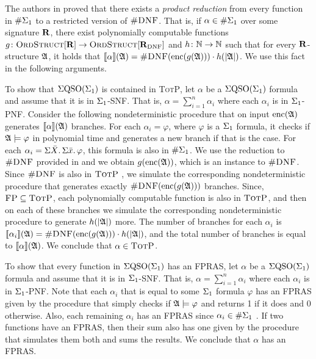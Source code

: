 
The authors in \cite{SalujaST95} proved that there exists a {\em product reduction} from every function in $\#\Sigma_{1}$ to a restricted version of $\textsc{\#DNF}$. 
That is, if $\alpha\in\#\Sigma_{1}$ over some signature $\mathbf{R}$, there exist polynomially computable functions $g\colon\text{\sc OrdStruct}[\mathbf{R}]\to\text{\sc OrdStruct}[\mathbf{R}_{\text{DNF}}]$ and $h\colon\mathbb{N}\to\mathbb{N}$ such that for every $\mathbf{R}$-structure $\mathfrak{A}$, it holds that ${\llbracket{}{\alpha}\rrbracket}(\mathfrak{A}) = \textsc{\#DNF}({\rm enc}(g(\mathfrak{A})))\cdot h(\vert \mathfrak{A} \vert)$. We use this fact in the following arguments. 

To show that $\Sigma{\rm QSO}(\Sigma_{1})$ is contained  in \textsc{TotP}, let $\alpha$ be a $\Sigma{\rm QSO}(\Sigma_{1})$ formula and assume that it is in $\Sigma_{1}$-SNF. 
That is, $\alpha = \sum_{i = 1}^n\alpha_i$ where each $\alpha_i$ is in $\Sigma_{1}$-PNF. 
Consider the following nondeterministic procedure that on input ${\rm enc}(\mathfrak{A})$ generates ${\llbracket{}{\alpha}\rrbracket}(\mathfrak{A})$ branches. 
For each $\alpha_i = \varphi$, where $\varphi$ is a $\Sigma_{1}$ formula, it checks if $\mathfrak{A}\models\varphi$ in polynomial time and generates a new branch if that is the case. 
For each $\alpha_i = \Sigma{\bar{X}}.\,\Sigma{\bar{x}}.\,\varphi$, this formula is also in $\#\Sigma_{1}$. 
We use the reduction to $\textsc{\#DNF}$ provided in \cite{SalujaST95} and we obtain $g({\rm enc}(\mathfrak{A}))$, which is an instance to $\textsc{\#DNF}$. 
Since $\textsc{\#DNF}$ is also in $\text{\sc TotP}$ \cite{PagourtzisZ06}, we simulate the corresponding nondeterministic procedure that generates exactly $\textsc{\#DNF}({\rm enc}(g(\mathfrak{A})))$ branches. 
Since, $\text{\sc FP}\subseteq\text{\sc TotP}$\cite{PagourtzisZ06}, each polynomially computable function is also in $\text{\sc TotP}$, and then on each of these branches we simulate the corresponding nondeterministic procedure to generate $h(\vert \mathfrak{A} \vert)$ more. 
The number of branches for each $\alpha_i$ is ${\llbracket{}{\alpha_i}\rrbracket}(\mathfrak{A}) = \textsc{\#DNF}({\rm enc}(g(\mathfrak{A})))\cdot h(\vert \mathfrak{A} \vert)$, and the total number of branches is equal to ${\llbracket{}{\alpha}\rrbracket}(\mathfrak{A})$. 
We conclude that $\alpha\in\text{\sc TotP}$.

To show that every function in $\Sigma{\rm QSO}(\Sigma_{1})$ has an FPRAS,  let $\alpha$ be a $\Sigma{\rm QSO}(\Sigma_{1})$ formula and assume that it is in $\Sigma_{1}$-SNF. 
That is, $\alpha = \sum_{i = 1}^n\alpha_i$ where each $\alpha_i$ is in $\Sigma_{1}$-PNF. 
Note that each $\alpha_i$ that is equal to some $\Sigma_{1}$ formula $\varphi$ has an FPRAS given by the procedure that simply checks if $\mathfrak{A}\models\varphi$ and returns 1 if it does and 0 otherwise. 
Also, each remaining $\alpha_i$ has an FPRAS since $\alpha_i\in \#\Sigma_{1}$ \cite{SalujaST95}. 
If two functions have an FPRAS, then their sum also has one given by the procedure that simulates them both and sums the results. 
We conclude that $\alpha$ has an FPRAS.

